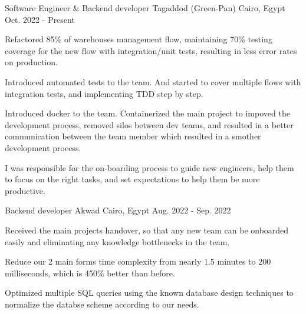 

\begin{cventries}

  \cventry
    {Software Engineer \& Backend developer} %
    {Tagaddod (Green-Pan)} %
    {Cairo, Egypt} %
    {Oct. 2022 - Present} %
    {
      \begin{cvitems} %
        \item {Refactored 85\% of warehouses management flow, maintaining 70\% testing coverage for the new flow with integration/unit tests, resulting in less error rates on production.}
        \item {Introduced automated tests to the team. And started to cover multiple flows with integration tests, and implementing TDD step by step.}
        \item {Introduced docker to the team. Containerized the main project to impoved the development process, removed silos between dev teams, and resulted in a better communication between the team member which resulted in a smother development process.}
        \item {I was responsible for the on-boarding process to guide new engineers, help them to focus on the right tasks, and set expectations to help them be more productive.}
      \end{cvitems}
    }

  \cventry
    {Backend developer} %
    {Akwad} %
    {Cairo, Egypt} %
    {Aug. 2022 - Sep. 2022} %
    {
      \begin{cvitems} %
        \item {Received the main projects handover, so that any new team can be onboarded easily and eliminating any knowledge bottlenecks in the team.}
        \item {Reduce our 2 main forms time complexity from nearly 1.5 minutes to 200 milliseconds, which is 450\% better than before.}
        \item {Optimized multiple SQL queries using the known database design techniques to normalize the databse scheme according to our needs.}
      \end{cvitems}
    }


\end{cventries}
